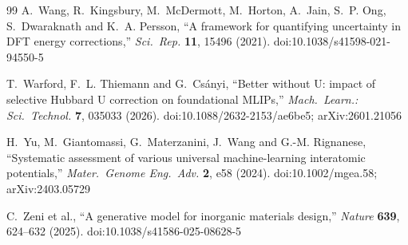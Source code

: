 \documentclass[11pt]{article}
\begin{document}
\begin{thebibliography}{99}
 A.~Wang, R.~Kingsbury, M.~McDermott,
M.~Horton, A.~Jain, S.~P. Ong, S.~Dwaraknath and K.~A. Persson, ``A framework for
quantifying uncertainty in DFT energy corrections,'' \emph{Sci.~Rep.} \textbf{11}, 15496
(2021). doi:10.1038/s41598-021-94550-5

 T.~Warford, F.~L. Thiemann and
G.~Cs\'anyi, ``Better without U: impact of selective Hubbard U correction on
foundational MLIPs,'' \emph{Mach.~Learn.: Sci.~Technol.} \textbf{7}, 035033 (2026).
doi:10.1088/2632-2153/ae6be5; arXiv:2601.21056

 H.~Yu, M.~Giantomassi, G.~Materzanini, J.~Wang and
G.-M. Rignanese, ``Systematic assessment of various universal machine-learning interatomic
potentials,'' \emph{Mater.~Genome Eng.~Adv.} \textbf{2}, e58 (2024).
doi:10.1002/mgea.58; arXiv:2403.05729

 C.~Zeni et al., ``A generative model for
inorganic materials design,'' \emph{Nature} \textbf{639}, 624--632 (2025).
doi:10.1038/s41586-025-08628-5

\end{thebibliography}
\end{document}
